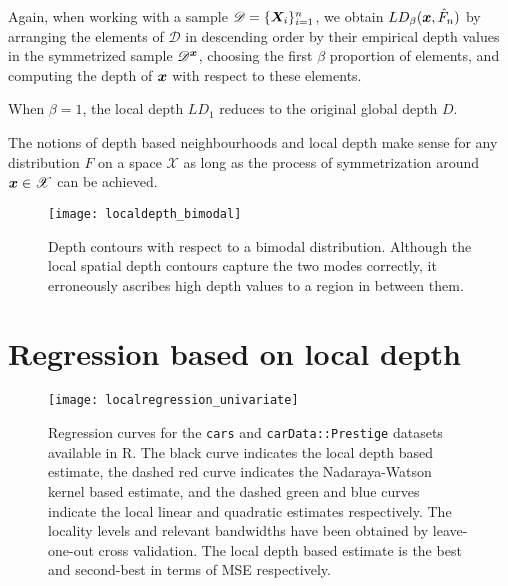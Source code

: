 Again, when working with a sample $\mathscr{D} = \{\bm{X}_i\}_{i = 1}^n$, we
obtain $LD_\beta(\bm{x}, \hat{F}_n)$ by arranging the elements of $\mathscr{D}$
in descending order by their empirical depth values in the symmetrized sample
$\mathscr{D}^{\bm{x}}$, choosing the first $\beta$ proportion of elements, and
computing the depth of $\bm{x}$ with respect to these elements.

\begin{remark}
    When $\beta = 1$, the local depth $LD_1$ reduces to the original global
    depth $D$.
\end{remark}

\begin{remark}
    The notions of depth based neighbourhoods and local depth make sense for
    any distribution $F$ on a space $\mathscr{X}$ as long as the process of
    symmetrization around $\bm{x} \in \mathscr{X}$ can be achieved.
\end{remark}


\begin{figure}
    \centering
    \texttt{[image: localdepth\_bimodal]}
    \caption{
        Depth contours with respect to a bimodal distribution.
        Although the local spatial depth contours capture the two modes
        correctly, it erroneously ascribes high depth values to a region in
        between them.
    }
    \label{fig:localdepth_bimodal}
\end{figure}


\section{Regression based on local depth}

\begin{figure}
    \centering
    \texttt{[image: localregression\_univariate]}
    \caption{
        Regression curves for the \texttt{cars} and \texttt{carData::Prestige}
        datasets available in R.
        The black curve indicates the local depth based estimate, the dashed
        red curve indicates the Nadaraya-Watson kernel based estimate, and the
        dashed green and blue curves indicate the local linear and quadratic
        estimates respectively.
        The locality levels and relevant bandwidths have been obtained by
        leave-one-out cross validation.
        The local depth based estimate is the best and second-best in terms of
        MSE respectively.
    }
    \label{fig:localregression_univariate}
\end{figure}


